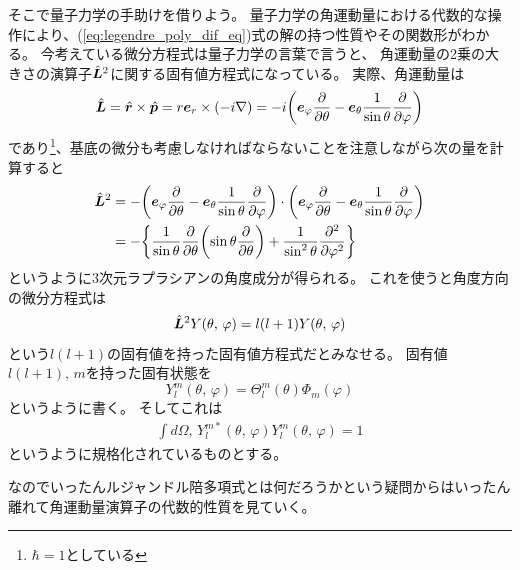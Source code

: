 \documentclass[../../master.tex]{subfiles}
\begin{document}
そこで量子力学の手助けを借りよう。
量子力学の角運動量における代数的な操作により、(\ref{eq:legendre_poly_dif_eq})式の解の持つ性質やその関数形がわかる。
今考えている微分方程式は量子力学の言葉で言うと、
角運動量の2乗の大きさの演算子\(\hat{\vb*{L}}^2\)に関する固有値方程式になっている。
実際、角運動量は
\begin{align}
	\hat{\vb*{L}}  = \hat{\vb*{r}} \times \hat{\vb*{p}}
	               = r\vb*{e}_r \times \qty(-i\nabla)
	               =-i\qty(\vb*{e}_{\varphi}\pdv{\theta}-\vb*{e}_{\theta}\frac{1}{\sin\theta}\pdv{\varphi})
\end{align}
であり\footnote{\(\hbar=1\)としている}、基底の微分も考慮しなければならないことを注意しながら次の量を計算すると
\begin{equation}\begin{aligned}[b]
    \hat{\vb*{L}}^2 & = -\qty(\vb*{e}_{\varphi}\pdv{\theta}-\vb*{e}_{\theta}\frac{1}{\sin\theta}\pdv{\varphi})\cdot\qty(\vb*{e}_{\varphi}\pdv{\theta}-\vb*{e}_{\theta}\frac{1}{\sin\theta}\pdv{\varphi}) \\
	                & = -\qty{\frac{1}{\sin\theta}\pdv{\theta}\qty(\sin\theta\pdv{\theta})+\frac{1}{\sin^2\theta}\pdv[2]{\varphi}}
\end{aligned}\end{equation}
というように3次元ラプラシアンの角度成分が得られる。
これを使うと角度方向の微分方程式は
\begin{equation}
	\hat{\vb*{L}}^2 Y(\theta,\,\varphi) = l(l+1) Y(\theta,\,\varphi)
\end{equation}
という\(l(l+1)\)の固有値を持った固有値方程式だとみなせる。
固有値\(l(l+1),\,m\)を持った固有状態を
\begin{equation}
	Y_l^m(\theta,\,\varphi) = \Theta_l^m(\theta)\Phi_m(\varphi)
\end{equation}
というように書く。
そしてこれは
\begin{align}
	\int d\Omega ,\, Y_{l}^{m*}(\theta,\,\varphi)Y_{l}^m(\theta,\,\varphi) = 1
\end{align}
というように規格化されているものとする。

なのでいったんルジャンドル陪多項式とは何だろうかという疑問からはいったん離れて角運動量演算子の代数的性質を見ていく。
\end{document}

